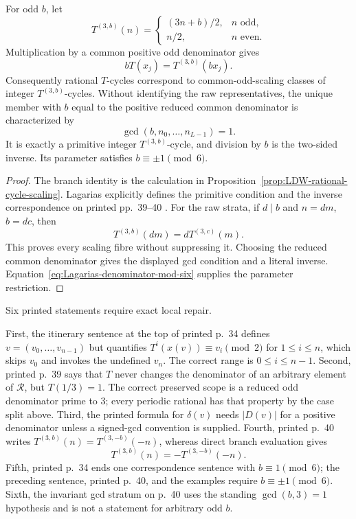 \begin{proposition}
\label{prop:Lagarias-primitive-scaling}
For odd $b$, let
\[
 T^{(3,b)}(n)=
 \begin{cases}
 (3n+b)/2,&n\text{ odd},\\
 n/2,&n\text{ even}.
 \end{cases}
\]
Multiplication by a common positive odd denominator gives
\[
 bT(x_j)=T^{(3,b)}(bx_j).
\]
Consequently rational $T$-cycles correspond to common-odd-scaling classes
of integer $T^{(3,b)}$-cycles.  Without identifying the raw representatives,
the unique member with $b$ equal to the positive reduced common denominator
is characterized by
\[
 \gcd(b,n_0,\ldots,n_{L-1})=1.
\]
It is exactly a primitive integer $T^{(3,b)}$-cycle, and division by $b$ is
the two-sided inverse.  Its parameter satisfies $b\equiv\pm1\pmod6$.
\end{proposition}

\begin{proof}
The branch identity is the calculation in
Proposition~\ref{prop:LDW-rational-cycle-scaling}.  Lagarias explicitly
defines the primitive condition and the inverse correspondence on printed
pp.~39--40 \cite{Lagarias1990}.  For the raw strata, if $d\mid b$ and
$n=dm$, $b=dc$, then
\[
 T^{(3,b)}(dm)=dT^{(3,c)}(m).
\]
This proves every scaling fibre without suppressing it.  Choosing the reduced
common denominator gives the displayed gcd condition and a literal inverse.
Equation~\eqref{eq:Lagarias-denominator-mod-six} supplies the parameter
restriction.
\end{proof}

\begin{sourceissue}
\label{sourceissue:Lagarias1990-local-defects}
Six printed statements require exact local repair.

First, the itinerary sentence at the top of printed p.~34 defines
$v=(v_0,\ldots,v_{n-1})$ but quantifies
$T^i(x(v))\equiv v_i\pmod2$ for $1\leq i\leq n$, which skips $v_0$ and invokes
the undefined $v_n$.  The correct range is $0\leq i\leq n-1$.  Second,
printed p.~39 says that $T$ never changes the denominator of an
arbitrary element of $\mathcal R$, but $T(1/3)=1$.  The correct preserved
scope is a reduced odd denominator prime to $3$; every periodic rational has
that property by the case split above.  Third, the printed formula for
$\delta(v)$ needs $|D(v)|$ for a positive denominator unless a signed-gcd
convention is supplied.  Fourth, printed p.~40 writes
$T^{(3,b)}(n)=T^{(3,-b)}(-n)$, whereas direct branch evaluation gives
\[
 T^{(3,b)}(n)=-T^{(3,-b)}(-n).
\]
Fifth, printed p.~34 ends one correspondence sentence with
$b\equiv1\pmod6$; the preceding sentence, printed p.~40, and the examples
require $b\equiv\pm1\pmod6$.  Sixth, the invariant gcd stratum on p.~40 uses
the standing $\gcd(b,3)=1$ hypothesis and is not a statement for arbitrary
odd $b$.
\end{sourceissue}

